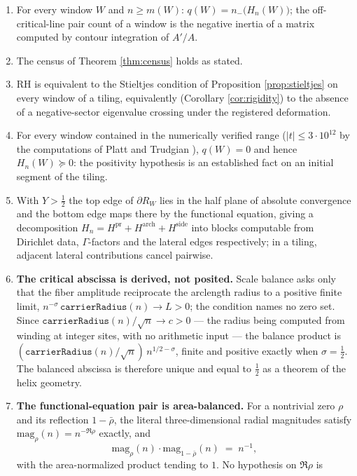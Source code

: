 \documentclass[11pt]{article}
\theoremstyle{plain}
\theoremstyle{definition}
\theoremstyle{remark}
\begin{document}
\begin{enumerate}
\item[(U1)] For every window $W$ and $n\ge m(W)$: $q(W)=n_-\bigl(H_n(W)\bigr)$; the
off-critical-line pair count of a window is the negative inertia of a matrix computed by
contour integration of $A'/A$.
\item[(U2)] The census of Theorem \ref{thm:census} holds as stated.
\item[(U3)] RH is equivalent to the Stieltjes condition of Proposition
\ref{prop:stieltjes} on every window of a tiling, equivalently (Corollary
\ref{cor:rigidity}) to the absence of a negative-sector eigenvalue crossing under the
registered deformation.
\item[(U4)] For every window contained in the numerically verified range
($|t|\le 3\cdot 10^{12}$ by the computations of Platt and Trudgian
\cite{PlattTrudgian2021}), $q(W)=0$ and hence
$H_n(W)\succeq 0$: the positivity hypothesis is an established fact on an initial
segment of the tiling.
\item[(U5)] With $Y>\tfrac12$ the top edge of $\partial R_W$ lies in the half plane of
absolute convergence and the bottom edge maps there by the functional equation, giving a
decomposition $H_n = H^{\mathrm{pr}} + H^{\mathrm{arch}} + H^{\mathrm{side}}$ into blocks
computable from Dirichlet data, $\Gamma$-factors and the lateral edges respectively; in a
tiling, adjacent lateral contributions cancel pairwise.
\item[(U6)] \textbf{The critical abscissa is derived, not posited.} Scale balance
asks only that the fiber amplitude reciprocate the arclength radius to a positive
finite limit, \(n^{-\sigma}\,\texttt{carrierRadius}(n)\to L>0\); the condition names
no zero set. Since \(\texttt{carrierRadius}(n)/\sqrt n\to c>0\) --- the radius being
computed from winding at integer sites, with no arithmetic input --- the balance
product is \((\texttt{carrierRadius}(n)/\sqrt n)\,n^{1/2-\sigma}\), finite and
positive exactly when \(\sigma=\tfrac12\). The balanced abscissa is therefore unique
and equal to \(\tfrac12\) as a theorem of the helix geometry.
\item[(U7)] \textbf{The functional-equation pair is area-balanced.} For a nontrivial
zero \(\rho\) and its reflection \(1-\bar\rho\), the literal three-dimensional radial
magnitudes satisfy \(\mathrm{mag}_\rho(n)=n^{-\Re\rho}\) exactly, and
\[
  \mathrm{mag}_\rho(n)\cdot \mathrm{mag}_{1-\bar\rho}(n)\;=\;n^{-1},
\]
with the area-normalized product tending to \(1\). No hypothesis on \(\Re\rho\) is

\end{enumerate}
\end{document}
